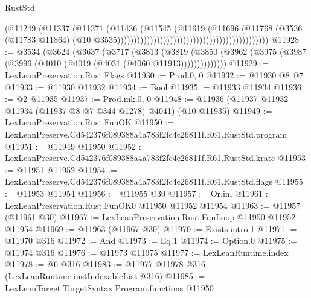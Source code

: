 \begin{lexlean}{RustStd}
\begin{coremodule}
                                                                            (@11249
                                                                              (@11337
                                                                                (@11371
                                                                                  (@11436
                                                                                    (@11545
                                                                                      (@11619
                                                                                        (@11696
                                                                                          (@11768
                                                                                            (@3536
                                                                                              (@11783
                                                                                                @11864)
                                                                                              (@10
                                                                                                @3535))))))))))))))))))))))))))))))))))))))))))))))
@11928 := @3534
    (@3624
      (@3637
        (@3717
          (@3813
            (@3819
              (@3850 (@3962 (@3975 (@3987 (@3996 (@4010 (@4019 (@4031 (@4060 @11913))))))))))))))
@11929 := LexLeanPreservation.Rust.Flags
@11930 := Prod.{0, 0}
@11932 := @11930 @8 @7
@11933 := @11930 @11932
@11934 := Bool
@11935 := @11933 @11934
@11936 := @2 @11935
@11937 := Prod.mk.{0, 0}
@11948 := @11936 (@11937 @11932 @11934 (@11937 @8 @7 @344 @1278) @4041) (@10 @11935)
@11949 := LexLeanPreservation.Rust.FunOK
@11950 := LexLeanPreserve.Cd542376f089388a4a783f2fc4c26811f.R61.RustStd.program
@11951 := @11949 @11950
@11952 := LexLeanPreserve.Cd542376f089388a4a783f2fc4c26811f.R61.RustStd.krate
@11953 := @11951 @11952
@11954 := LexLeanPreserve.Cd542376f089388a4a783f2fc4c26811f.R61.RustStd.flags
@11955 := @11953 @11954
@11956 := @11955 @30
@11957 := Or.inl
@11961 := LexLeanPreservation.Rust.FunOK0 @11950 @11952 @11954
@11963 := @11957 (@11961 @30)
@11967 := LexLeanPreservation.Rust.FunLoop @11950 @11952 @11954
@11969 := @11963 (@11967 @30)
@11970 := Exists.intro.{1}
@11971 := @11970 @316
@11972 := And
@11973 := Eq.{1}
@11974 := Option.{0}
@11975 := @11974 @316
@11976 := @11973 @11975
@11977 := LexLeanRuntime.index
@11978 := @6 @316
@11983 := @11977 @11978 @316 (LexLeanRuntime.instIndexableList @316)
@11985 := LexLeanTarget.TargetSyntax.Program.functions @11950

\end{coremodule}
\end{lexlean}
